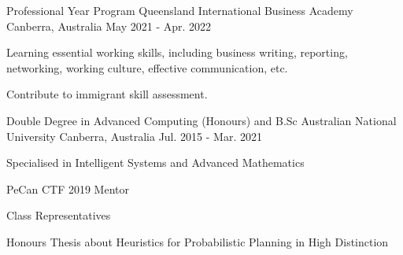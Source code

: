 

\begin{cventries}

\cventry
    {Professional Year Program} %
    {Queensland International Business Academy} %
    {Canberra, Australia} %
    {May 2021 - Apr. 2022} %
    {
    	\begin{cvitems} %
      		\item {Learning essential working skills, including business writing, reporting, networking, working culture, effective communication, etc.}
        	\item {Contribute to immigrant skill assessment.}
       	\end{cvitems}
    }

  \cventry
    {Double Degree in Advanced Computing (Honours) and B.Sc} %
    {Australian National University} %
    {Canberra, Australia} %
    {Jul. 2015 - Mar. 2021} %
    {
      \begin{cvitems} %
      	\item {Specialised in Intelligent Systems and Advanced Mathematics}
        \item {PeCan CTF 2019 Mentor}
        \item {Class Representatives}
        \item {Honours Thesis about Heuristics for Probabilistic Planning in High Distinction}
      \end{cvitems}
    }


  
\end{cventries}
